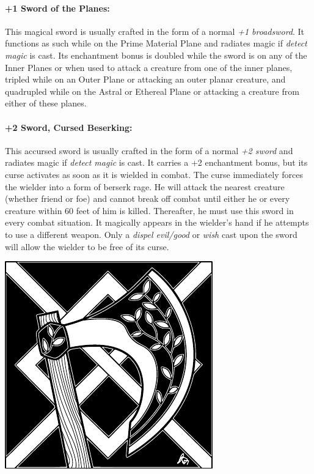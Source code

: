 \begin{multicols}{2}
\paragraph{+1 Sword of the Planes:} This magical sword is usually crafted in the form of a normal \textit{+1 broadsword}.  It functions as such while on the Prime Material Plane and radiates magic if \textit{detect magic} is cast.  Its enchantment bonus is doubled while the sword is on any of the Inner Planes or when used to attack a creature from one of the inner planes, tripled while on an Outer Plane or attacking an outer planar creature, and quadrupled while on the Astral or Ethereal Plane or attacking a creature from either of these planes.

\paragraph{+2 Sword, Cursed Beserking:} This accursed sword is usually crafted in the form of a normal \textit{+2 sword} and radiates magic if \textit{detect magic} is cast.  It carries a +2 enchantment bonus, but its curse activates as soon as it is wielded in combat.  The curse immediately forces the wielder into a form of berserk rage.  He will attack the nearest creature (whether friend or foe) and cannot break off combat until either he or every creature within 60 feet of him is killed.  Thereafter, he must use this sword in every combat situation.  It magically appears in the wielder's hand if he attempts to use a different weapon.  Only a \textit{dispel evil/good} or \textit{wish} cast upon the sword will allow the wielder to be free of its curse.

\begin{center}

\noindent\includegraphics[width=0.92\columnwidth]{axe2e.pdf}\label{axe2e}


\end{center}
\end{multicols}

